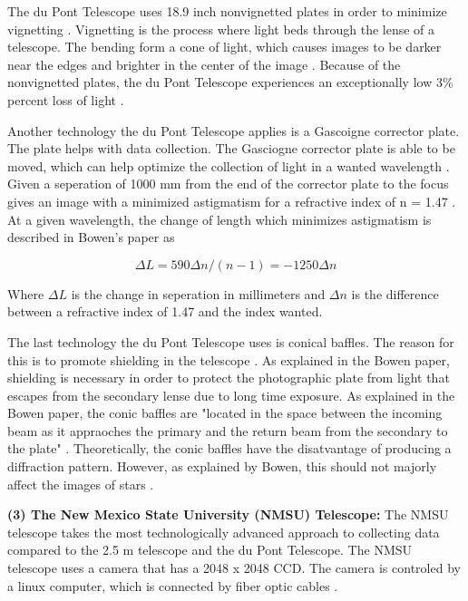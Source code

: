 \documentclass[preprint,linenumbers, longauthor]{aastex631}
\begin{document}
The du Pont Telescope uses 18.9 inch nonvignetted plates in order to minimize vignetting \cite{bowenOpticalDesign40in1973}. Vignetting is the process where light beds through the lense of a telescope. The bending form a cone of light, which causes images to be darker near the edges and brighter in the center of the image \cite{richardsWhatVignetting2020}.
Because of the nonvignetted plates, the du Pont Telescope experiences an exceptionally low 3\% percent loss of light \cite{bowenOpticalDesign40in1973}.

Another technology the du Pont Telescope applies is a Gascoigne corrector plate. The plate helps with data collection. The Gasciogne corrector plate is able to be moved, which can help optimize the collection of light in a wanted wavelength \cite{bowenOpticalDesign40in1973}.
Given a seperation of 1000 mm from the end of the corrector plate to the focus gives an image with a minimized astigmatism for a refractive index of n = 1.47 \cite{bowenOpticalDesign40in1973}.
At a given wavelength, the change of length which minimizes astigmatism is described in Bowen's paper as

\begin{equation}
\Delta L = 590\Delta n / (n - 1) = -1250\Delta n
\end{equation}

Where $\Delta L$ is the change in seperation in millimeters and $\Delta n$ is the difference between a refractive index of 1.47 and the index wanted.

The last technology the du Pont Telescope uses is conical baffles. The reason for this is to promote shielding in the telescope \cite{bowenOpticalDesign40in1973}.
As explained in the Bowen paper, shielding is necessary in order to protect the photographic plate from light that escapes from the secondary lense due to long time exposure.
As explained in the Bowen paper, the conic baffles are "located in the space between the incoming beam as it appraoches the primary and the return beam from the secondary to the plate" \cite{bowenOpticalDesign40in1973}.
Theoretically, the conic baffles have the disatvantage of producing a diffraction pattern. However, as explained by Bowen, this should not majorly affect the images of stars \cite{bowenOpticalDesign40in1973}. 

\textbf{(3) The New Mexico State University (NMSU) Telescope:}  
The NMSU telescope takes the most technologically advanced approach to collecting data compared to the 2.5 m telescope and the du Pont Telescope.
The NMSU telescope uses a camera that has a 2048 x 2048 CCD. The camera is controled by a linux computer, which is connected by fiber optic cables \cite{holtzmanNMSU1Telescope2010}.
\end{document}
